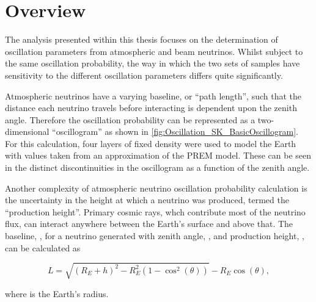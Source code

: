 \section{Overview}
\label{sec:Oscillation_Overview}

The analysis presented within this thesis focuses on the determination of oscillation parameters from atmospheric and beam neutrinos. Whilst subject to the same oscillation probability, the way in which the two sets of samples have sensitivity to the different oscillation parameters differs quite significantly.

Atmospheric neutrinos have a varying baseline, or ``path length'', such that the distance each neutrino travels before interacting is dependent upon the zenith angle. Therefore the oscillation probability can be represented as a two-dimensional ``oscillogram'' as shown in \autoref{fig:Oscillation_SK_BasicOscillogram}. For this calculation, four layers of fixed density were used to model the Earth with values taken from an approximation of the PREM model. These can be seen in the distinct discontinuities in the oscillogram as a function of the zenith angle.

Another complexity of atmospheric neutrino oscillation probability calculation is the uncertainty in the height at which a neutrino was produced, termed the ``production height''. Primary cosmic rays, whch contribute most of the neutrino flux, can interact anywhere between the Earth's surface and  above that. The baseline, , for a neutrino generated with zenith angle, \quickmath{\theta}, and production height, , can be calculated as

\begin{equation}
  L = \sqrt{\left(R_{E} + h\right)^{2} - R_{E}^{2} \left(1 - \cos^{2} \left(\theta \right) \right)} - R_{E}\cos(\theta),
\end{equation}

where  is the Earth's radius.

